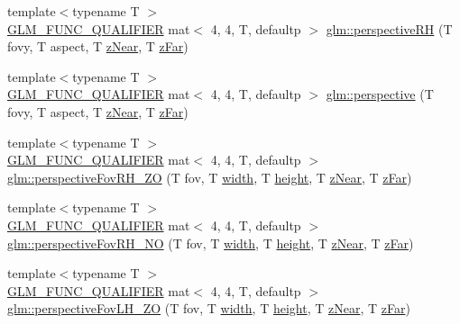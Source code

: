 \begin{DoxyCompactItemize}
\item 
{\footnotesize template$<$typename T $>$ }\\\hyperlink{setup_8hpp_a33fdea6f91c5f834105f7415e2a64407}{G\+L\+M\+\_\+\+F\+U\+N\+C\+\_\+\+Q\+U\+A\+L\+I\+F\+I\+ER} mat$<$ 4, 4, T, defaultp $>$ \hyperlink{group__gtc__matrix__transform_ga26b88757fbd90601b80768a7e1ad3aa1}{glm\+::perspective\+RH} (T fovy, T aspect, T \hyperlink{_s_d_l__opengl__glext_8h_a12d99226e590bbaaf0be69169eeb4834}{z\+Near}, T \hyperlink{_s_d_l__opengl__glext_8h_a1052a8235df129542aea6da80fbec6a1}{z\+Far})
\item 
{\footnotesize template$<$typename T $>$ }\\\hyperlink{setup_8hpp_a33fdea6f91c5f834105f7415e2a64407}{G\+L\+M\+\_\+\+F\+U\+N\+C\+\_\+\+Q\+U\+A\+L\+I\+F\+I\+ER} mat$<$ 4, 4, T, defaultp $>$ \hyperlink{group__gtc__matrix__transform_ga747c8cf99458663dd7ad1bb3a2f07787}{glm\+::perspective} (T fovy, T aspect, T \hyperlink{_s_d_l__opengl__glext_8h_a12d99226e590bbaaf0be69169eeb4834}{z\+Near}, T \hyperlink{_s_d_l__opengl__glext_8h_a1052a8235df129542aea6da80fbec6a1}{z\+Far})
\item 
{\footnotesize template$<$typename T $>$ }\\\hyperlink{setup_8hpp_a33fdea6f91c5f834105f7415e2a64407}{G\+L\+M\+\_\+\+F\+U\+N\+C\+\_\+\+Q\+U\+A\+L\+I\+F\+I\+ER} mat$<$ 4, 4, T, defaultp $>$ \hyperlink{group__gtc__matrix__transform_ga7dcbb25331676f5b0795aced1a905c44}{glm\+::perspective\+Fov\+R\+H\+\_\+\+ZO} (T fov, T \hyperlink{_s_d_l__opengl_8h_a9a82cf3caff84cabc4598e2619faac17}{width}, T \hyperlink{_s_d_l__opengl_8h_aa352f2804b9902ac30769c00dde75d5f}{height}, T \hyperlink{_s_d_l__opengl__glext_8h_a12d99226e590bbaaf0be69169eeb4834}{z\+Near}, T \hyperlink{_s_d_l__opengl__glext_8h_a1052a8235df129542aea6da80fbec6a1}{z\+Far})
\item 
{\footnotesize template$<$typename T $>$ }\\\hyperlink{setup_8hpp_a33fdea6f91c5f834105f7415e2a64407}{G\+L\+M\+\_\+\+F\+U\+N\+C\+\_\+\+Q\+U\+A\+L\+I\+F\+I\+ER} mat$<$ 4, 4, T, defaultp $>$ \hyperlink{group__gtc__matrix__transform_ga257b733ff883c9a065801023cf243eb2}{glm\+::perspective\+Fov\+R\+H\+\_\+\+NO} (T fov, T \hyperlink{_s_d_l__opengl_8h_a9a82cf3caff84cabc4598e2619faac17}{width}, T \hyperlink{_s_d_l__opengl_8h_aa352f2804b9902ac30769c00dde75d5f}{height}, T \hyperlink{_s_d_l__opengl__glext_8h_a12d99226e590bbaaf0be69169eeb4834}{z\+Near}, T \hyperlink{_s_d_l__opengl__glext_8h_a1052a8235df129542aea6da80fbec6a1}{z\+Far})
\item 
{\footnotesize template$<$typename T $>$ }\\\hyperlink{setup_8hpp_a33fdea6f91c5f834105f7415e2a64407}{G\+L\+M\+\_\+\+F\+U\+N\+C\+\_\+\+Q\+U\+A\+L\+I\+F\+I\+ER} mat$<$ 4, 4, T, defaultp $>$ \hyperlink{group__gtc__matrix__transform_gabdd37014f529e25b2fa1b3ba06c10d5c}{glm\+::perspective\+Fov\+L\+H\+\_\+\+ZO} (T fov, T \hyperlink{_s_d_l__opengl_8h_a9a82cf3caff84cabc4598e2619faac17}{width}, T \hyperlink{_s_d_l__opengl_8h_aa352f2804b9902ac30769c00dde75d5f}{height}, T \hyperlink{_s_d_l__opengl__glext_8h_a12d99226e590bbaaf0be69169eeb4834}{z\+Near}, T \hyperlink{_s_d_l__opengl__glext_8h_a1052a8235df129542aea6da80fbec6a1}{z\+Far})

\end{DoxyCompactItemize}
